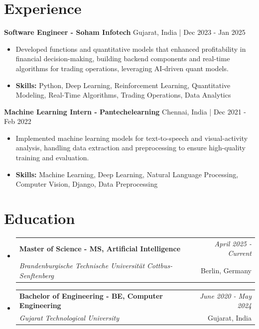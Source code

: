 \documentclass[a4paper,11pt]{article}
\makeatletter
\newcommand{\resumeSubheading}[4]{
\vspace{0.5mm}\item
    \begin{tabular*}{\linewidth}[t]{l@{\extracolsep{\fill}}r}
        \textbf{#1} & \textit{\footnotesize{#4}} \\
        \textit{\footnotesize{#3}} &  \footnotesize{#2}\\
    \end{tabular*}
    \vspace{-2.4mm}
}
\makeatother
\begin{document}
\section{\textbf{Experience}}


\vspace{1mm}
  \textbf{Software Engineer - Soham Infotech} \hfill Gujarat, India | Dec 2023 - Jan 2025
\vspace{-1.5mm} %
\begin{itemize}
  \item Developed functions and quantitative models that enhanced profitability in financial decision-making, building backend components and real-time algorithms for trading operations, leveraging AI-driven quant models.

\vspace{-2mm}
  \item \textbf{Skills:} Python, Deep Learning, Reinforcement Learning, Quantitative Modeling, Real-Time Algorithms, Trading Operations, Data Analytics
\end{itemize}

\vspace{1mm}
  \textbf{Machine Learning Intern - Pantechelearning} \hfill Chennai, India | Dec 2021 - Feb 2022
\vspace{-1.5mm} %
\begin{itemize}
  \item Implemented machine learning models for text-to-speech and visual-activity analysis, handling data extraction and preprocessing to ensure high-quality training and evaluation.
\vspace{-2mm}
  \item \textbf{Skills:} Machine Learning, Deep Learning, Natural Language Processing, Computer Vision, Django, Data Preprocessing
\end{itemize}\section{\textbf{Education}}
\vspace{-0.4mm}

\begin{itemize}[leftmargin=0.15in, label={}]
\resumeSubheading
{Master of Science - MS, Artificial Intelligence }{Berlin, Germany}
{Brandenburgische Technische Universität Cottbus-Senftenberg  }{April 2025 - Current}

\vspace{1.0mm} %
\resumeSubheading
{Bachelor of Engineering - BE, Computer Engineering  }{Gujarat, India}
{Gujarat Technological University }{June 2020 - May 2024}

\end{itemize}
\end{document}
